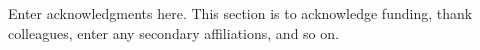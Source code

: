 \documentclass[draft]{agujournal2019}
\begin{document}
\acknowledgments
Enter acknowledgments here. This section is to acknowledge funding, thank colleagues, enter any secondary affiliations, and so on.


%
%





%
%
%
%
%
\end{document}
